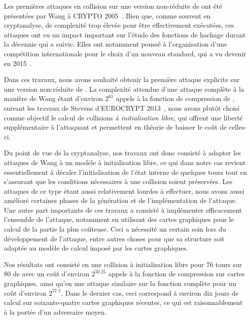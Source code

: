 \medskip

Les premières attaques en collision sur une version non-réduite de \shaone ont été présentées par Wang \etal à CRYPTO 2005~\cite{DBLP:conf/crypto/WangYY05a}. Bien que,
comme souvent en cryptanalyse, de complexité
trop élevée pour être effectivement exécutées, ces attaques ont eu un impact important sur l'étude des fonctions de hachage durant la décennie qui a suivie. Elles ont notamment poussé à l'organisation
d'une compétition internationale pour le choix d'un nouveau standard, qui a vu \keccak devenir \shathree en 2015~\cite{Nist-SHA3}.

Dans ces travaux, nous avons souhaité obtenir la première attaque explicite sur une version non-réduite de \shaone. La complexité attendue d'une attaque complète à la
manière de Wang étant d'environ $2^{61}$ appels
à la fonction de compression de \shaone, suivant les travaux de Stevens d'EUROCRYPT 2013~\cite{DBLP:conf/eurocrypt/Stevens13}, nous avons plutôt choisi comme objectif le calcul de collisions
\emph{à initialisation libre}, qui offrent une liberté supplémentaire à l'attaquant et permettent en théorie de baisser le coût de celles-ci.

Du point de vue de la cryptanalyse, nos travaux ont
donc consisté à adapter les attaques de Wang \etal à un modèle à initialisation libre, ce qui dans notre cas revient essentiellement à décaler l'initialisation de l'état interne \shaone de quelques
tours tout en s'assurant que les conditions nécessaires à une collision soient préservées. Les attaques de ce type étant aussi relativement lourdes à effectuer, nous avons aussi amélioré certaines
phases de la génération et de l'implémentation de l'attaque.
Une autre part importante de ces travaux a consisté à implémenter efficacement l'ensemble de l'attaque, notamment en utilisant des cartes graphiques pour le calcul de la partie la plus coûteuse.
Ceci a nécessité un certain soin lors du développement de l'attaque, entre autres choses pour que sa structure soit adaptée au modèle de calcul imposé par les cartes graphiques.

Nos résultats ont consisté en une collision à initialisation libre pour 76 tours sur 80 de \shaone avec un coût d'environ $2^{50.25}$ appels à la fonction de compression sur cartes graphiques,
ainsi qu'en une attaque similaire sur la fonction complète pour un coût d'environ $2^{57.5}$. Dans le dernier cas, ceci correspond à environ dix jours de calcul sur soixante-quatre cartes
graphiques récentes, ce qui est raisonnablement à la portée d'un adversaire moyen.


